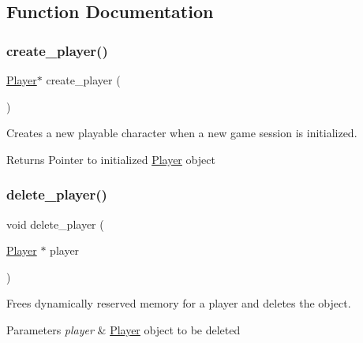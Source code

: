 \subsection{Function Documentation}
\hypertarget{group__player_ga37a8bafa3bd82b382ed0dc10b6a47bc6}{}\label{group__player_ga37a8bafa3bd82b382ed0dc10b6a47bc6} 
\subsubsection{\texorpdfstring{create\+\_\+player()}{create\_player()}}
{\footnotesize\ttfamily \hyperlink{struct_player}{Player}$\ast$ create\+\_\+player (\begin{DoxyParamCaption}{ }\end{DoxyParamCaption})}



Creates a new playable character when a new game session is initialized. 

\begin{DoxyReturn}{Returns}
Pointer to initialized \hyperlink{struct_player}{Player} \textquotesingle{}object\textquotesingle{} 
\end{DoxyReturn}
\hypertarget{group__player_ga9d6a1fdd44f008ff5eb4922118cce30a}{}\label{group__player_ga9d6a1fdd44f008ff5eb4922118cce30a} 
\subsubsection{\texorpdfstring{delete\+\_\+player()}{delete\_player()}}
{\footnotesize\ttfamily void delete\+\_\+player (\begin{DoxyParamCaption}\item[{\hyperlink{struct_player}{Player} $\ast$}]{player }\end{DoxyParamCaption})}



Frees dynamically reserved memory for a player and deletes the \textquotesingle{}object\textquotesingle{}. 


\begin{DoxyParams}{Parameters}
{\em player} & \hyperlink{struct_player}{Player} \textquotesingle{}object\textquotesingle{} to be deleted \\
\hline
\end{DoxyParams}
\hypertarget{group__player_ga2c6f1674abdd49f8d225fa2c76b864de}{}\label{group__player_ga2c6f1674abdd49f8d225fa2c76b864de} 
